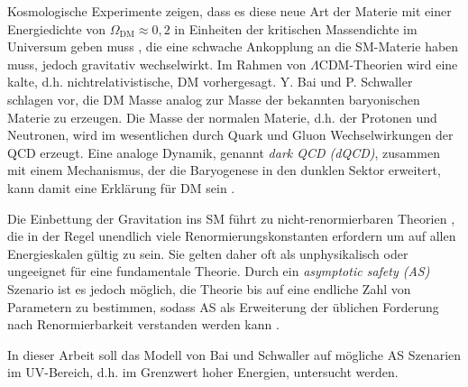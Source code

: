 Kosmologische Experimente zeigen, dass es diese neue Art der Materie mit einer 
Energiedichte von $\Omega_\text{DM}\approx 0,2$ in Einheiten der kritischen 
Massendichte im Universum geben muss \cite{PDG:DM}, die eine schwache 
Ankopplung an die SM-Materie haben muss, jedoch gravitativ wechselwirkt. 
Im Rahmen von $\Lambda$CDM-Theorien wird eine kalte, d.h. 
nichtrelativistische, DM vorhergesagt. 
Y. Bai und P. Schwaller schlagen vor, 
die DM Masse analog zur Masse der bekannten baryonischen Materie zu erzeugen.  
Die Masse der normalen Materie, d.h. der Protonen und Neutronen, wird im 
wesentlichen durch Quark und Gluon Wechselwirkungen der 
QCD erzeugt. Eine analoge Dynamik, genannt 
\textit{dark QCD (dQCD)}, zusammen mit einem Mechanismus, der die 
Baryogenese in den dunklen Sektor erweitert, kann damit eine  
Erklärung für DM sein \cite{Scale_of_dark_QCD}. 

Die Einbettung der Gravitation ins SM führt zu nicht-renormierbaren Theorien 
\cite{GR_Weinberg}, die in der Regel unendlich 
viele Renormierungskonstanten erfordern um auf allen Energieskalen gültig 
zu sein. Sie gelten daher oft als unphysikalisch oder ungeeignet für   
eine fundamentale Theorie. Durch ein \textit{asymptotic safety (AS)} 
Szenario ist es jedoch möglich, die Theorie bis auf eine endliche Zahl von 
Parametern zu bestimmen, sodass AS als Erweiterung der üblichen Forderung 
nach Renormierbarkeit verstanden werden kann \cite{GR_Weinberg}
\cite{Weinberg:1976}.

In dieser Arbeit soll das \QCDxdQCD Modell von Bai und Schwaller auf 
mögliche AS Szenarien im UV-Bereich, d.h. im Grenzwert hoher Energien, 
untersucht werden. 
    